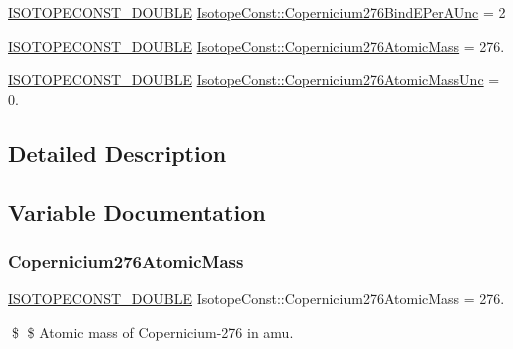 \begin{DoxyCompactItemize}
\item 
\mbox{\hyperlink{group___isotope_const-_macros_ga8f45a7272ce02c0b4c65c44636ed719a}{I\+S\+O\+T\+O\+P\+E\+C\+O\+N\+S\+T\+\_\+\+D\+O\+U\+B\+LE}} \mbox{\hyperlink{group___isotope_const-_copernicium-_cn276_ga251518ee926b9477d28a3469ebcae371}{Isotope\+Const\+::\+Copernicium276\+Bind\+E\+Per\+A\+Unc}} = 2
\item 
\mbox{\hyperlink{group___isotope_const-_macros_ga8f45a7272ce02c0b4c65c44636ed719a}{I\+S\+O\+T\+O\+P\+E\+C\+O\+N\+S\+T\+\_\+\+D\+O\+U\+B\+LE}} \mbox{\hyperlink{group___isotope_const-_copernicium-_cn276_gaaf619a4856b6506b5659a7f03f86a96b}{Isotope\+Const\+::\+Copernicium276\+Atomic\+Mass}} = 276.
\item 
\mbox{\hyperlink{group___isotope_const-_macros_ga8f45a7272ce02c0b4c65c44636ed719a}{I\+S\+O\+T\+O\+P\+E\+C\+O\+N\+S\+T\+\_\+\+D\+O\+U\+B\+LE}} \mbox{\hyperlink{group___isotope_const-_copernicium-_cn276_gad031fbb67e47051a456a95c01cb92469}{Isotope\+Const\+::\+Copernicium276\+Atomic\+Mass\+Unc}} = 0.
\end{DoxyCompactItemize}


\subsection{Detailed Description}


\subsection{Variable Documentation}
\mbox{\label{group___isotope_const-_copernicium-_cn276_gaaf619a4856b6506b5659a7f03f86a96b}} 
\subsubsection{\texorpdfstring{Copernicium276\+Atomic\+Mass}{Copernicium276AtomicMass}}
{\footnotesize\ttfamily \mbox{\hyperlink{group___isotope_const-_macros_ga8f45a7272ce02c0b4c65c44636ed719a}{I\+S\+O\+T\+O\+P\+E\+C\+O\+N\+S\+T\+\_\+\+D\+O\+U\+B\+LE}} Isotope\+Const\+::\+Copernicium276\+Atomic\+Mass = 276.}

\$ \$ Atomic mass of Copernicium-\/276 in amu. \mbox{\label{group___isotope_const-_copernicium-_cn276_gad031fbb67e47051a456a95c01cb92469}} 
